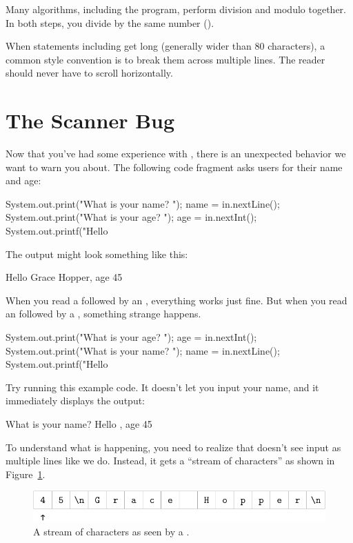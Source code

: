{{Many algorithms, including the  program, perform division and modulo together.
In both steps, you divide by the same number ().

When statements including  get long (generally wider than 80 characters), a common style convention is to break them across multiple lines.
The reader should never have to scroll horizontally.


\section{The Scanner Bug}

Now that you've had some experience with , there is an unexpected behavior we want to warn you about.
The following code fragment asks users for their name and age:

\begin{code}
System.out.print("What is your name? ");
name = in.nextLine();
System.out.print("What is your age? ");
age = in.nextInt();
System.out.printf("Hello %
\end{code}

The output might look something like this:

\begin{stdout}
Hello Grace Hopper, age 45
\end{stdout}

When you read a  followed by an , everything works just fine.
But when you read an  followed by a , something strange happens.

\begin{code}
System.out.print("What is your age? ");
age = in.nextInt();
System.out.print("What is your name? ");
name = in.nextLine();
System.out.printf("Hello %
\end{code}

Try running this example code.
It doesn't let you input your name, and it immediately displays the output:

\begin{stdout}
What is your name? Hello , age 45
\end{stdout}

To understand what is happening, you need to realize that  doesn't see input as multiple lines like we do.
Instead, it gets a ``stream of characters'' as shown in Figure~\ref{fig.hopper1}.

\begin{figure}[!ht]
\begin{center}
\includegraphics{figs/hopper1.pdf}
\caption{A stream of characters as seen by a .}
\label{fig.hopper1}
\end{center}
\end{figure}

}}
